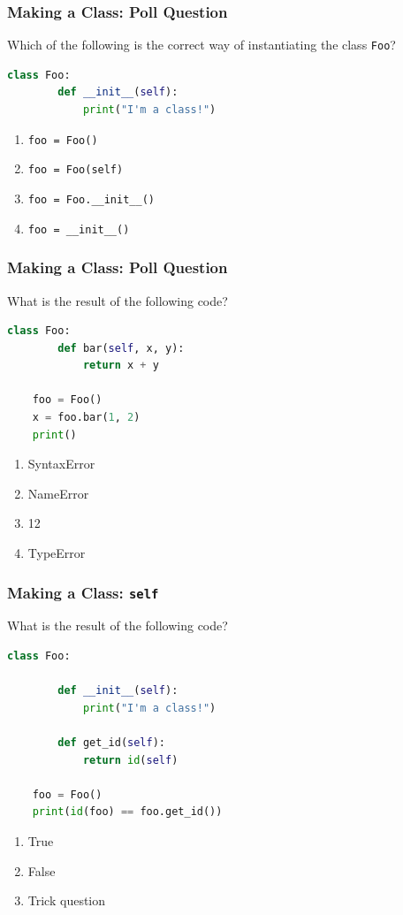 \documentclass{beamer}
\begin{document}
%
%
\begin{frame}[fragile]
	\frametitle{Making a Class: Poll Question}
	Which of the following is the correct way of instantiating the class \lstinline|Foo|?
	\begin{lstlisting}[language=Python, autogobble]
	class Foo:
		def __init__(self):
			print("I'm a class!")
	\end{lstlisting}
	\vfill
	\begin{enumerate}[A]
		\item \lstinline|foo = Foo()|
		\item \lstinline|foo = Foo(self)|
		\item \lstinline|foo = Foo.__init__()|
		\item \lstinline|foo = __init__()|
	\end{enumerate}
\end{frame}

%
%
\begin{frame}[fragile]
	\frametitle{Making a Class: Poll Question}
	What is the result of the following code?
	\begin{lstlisting}[language=Python, autogobble]
	class Foo:
		def bar(self, x, y):
			return x + y

	foo = Foo()
	x = foo.bar(1, 2)
	print()
	\end{lstlisting}
	\vfill
	\begin{enumerate}[A]
		\item SyntaxError
		\item NameError
		\item 12
		\item TypeError
	\end{enumerate}
\end{frame}


%
%
\begin{frame}[fragile]
	\frametitle{Making a Class: \lstinline|self|}
	What is the result of the following code?
	\begin{lstlisting}[language=Python, autogobble]
	class Foo:

		def __init__(self):
			print("I'm a class!")

		def get_id(self):
			return id(self)

	foo = Foo()
	print(id(foo) == foo.get_id())
	\end{lstlisting}
	\vfill
	\begin{enumerate}[A]
		\item True
		\item False
		\item Trick question
	\end{enumerate}
\end{frame}
\end{document}
